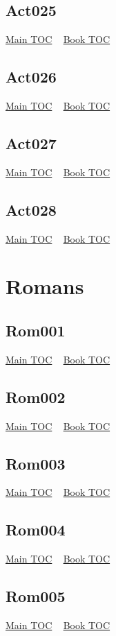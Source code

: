 \documentclass{book}
\begin{document}
  \section{Act025}\hyperlink{toc}{Main TOC} ~ \hyperref[subsec:Act]{Book TOC} 
  \section{Act026}\hyperlink{toc}{Main TOC} ~ \hyperref[subsec:Act]{Book TOC} 
  \section{Act027}\hyperlink{toc}{Main TOC} ~ \hyperref[subsec:Act]{Book TOC} 
  \section{Act028}\hyperlink{toc}{Main TOC} ~ \hyperref[subsec:Act]{Book TOC} 
  \chapter{Romans} \label{subsec:Rom} \begin{multicols}{2} \minitoc \end{multicols}
  \section{Rom001}\hyperlink{toc}{Main TOC} ~ \hyperref[subsec:Rom]{Book TOC} 
  \section{Rom002}\hyperlink{toc}{Main TOC} ~ \hyperref[subsec:Rom]{Book TOC} 
  \section{Rom003}\hyperlink{toc}{Main TOC} ~ \hyperref[subsec:Rom]{Book TOC} 
  \section{Rom004}\hyperlink{toc}{Main TOC} ~ \hyperref[subsec:Rom]{Book TOC} 
  \section{Rom005}\hyperlink{toc}{Main TOC} ~ \hyperref[subsec:Rom]{Book TOC} 
\end{document}
